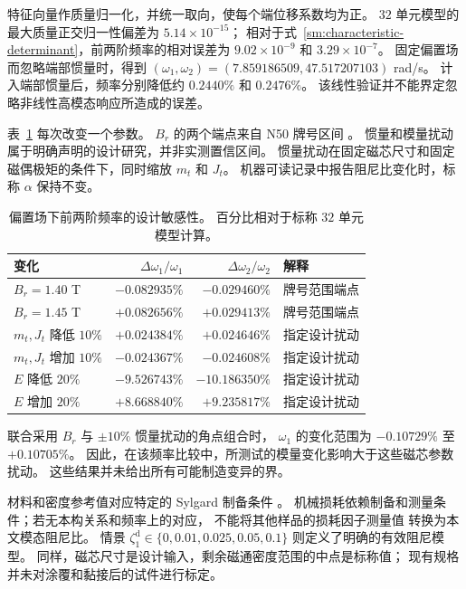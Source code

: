 特征向量作质量归一化，并统一取向，使每个端位移系数均为正。
$32$ 单元模型的最大质量正交归一性偏差为 $5.14\times10^{-15}$；
相对于式~\eqref{sm:characteristic-determinant}，前两阶频率的相对误差为
$9.02\times10^{-9}$ 和 $3.29\times10^{-7}$。
固定偏置场而忽略端部惯量时，得到
$(\omega_1,\omega_2)=(7.859186509,47.517207103)$ rad/s。
计入端部惯量后，频率分别降低约 $0.2440\%$ 和 $0.2476\%$。
该线性验证并不能界定忽略非线性高模态响应所造成的误差。

表~\ref{sm:sensitivity-table} 每次改变一个参数。
$B_r$ 的两个端点来自 N50 牌号区间 \citep{smN50}。
惯量和模量扰动属于明确声明的设计研究，并非实测置信区间。
惯量扰动在固定磁芯尺寸和固定磁偶极矩的条件下，同时缩放 $m_t$ 和 $J_t$。
机器可读记录中报告阻尼比变化时，标称 $\alpha$ 保持不变。

\begin{table}[t]
\centering\small
\caption{偏置场下前两阶频率的设计敏感性。
百分比相对于标称 $32$ 单元模型计算。}
\label{sm:sensitivity-table}
\begin{tabular}{lrrl}
\toprule
变化 & $\Delta\omega_1/\omega_1$ & $\Delta\omega_2/\omega_2$ & 解释\\
\midrule
$B_r=1.40$ T & $-0.082935\%$ & $-0.029460\%$ & 牌号范围端点\\
$B_r=1.45$ T & $+0.082656\%$ & $+0.029413\%$ & 牌号范围端点\\
$m_t,J_t$ 降低 $10\%$ & $+0.024384\%$ & $+0.024646\%$ & 指定设计扰动\\
$m_t,J_t$ 增加 $10\%$ & $-0.024367\%$ & $-0.024608\%$ & 指定设计扰动\\
$E$ 降低 $20\%$ & $-9.526743\%$ & $-10.186350\%$ & 指定设计扰动\\
$E$ 增加 $20\%$ & $+8.668840\%$ & $+9.235817\%$ & 指定设计扰动\\
\bottomrule
\end{tabular}
\end{table}

联合采用 $B_r$ 与 $\pm10\%$ 惯量扰动的角点组合时，
$\omega_1$ 的变化范围为 $-0.10729\%$ 至 $+0.10705\%$。
因此，在该频率比较中，所测试的模量变化影响大于这些磁芯参数扰动。
这些结果并未给出所有可能制造变异的界。

材料和密度参考值对应特定的 Sylgard 制备条件 \citep{cho2021pdms}。
机械损耗依赖制备和测量条件；若无本构关系和频率上的对应，
不能将其他样品的损耗因子测量值 \citep{fischer2017adhesion} 转换为本文模态阻尼比。
情景 $\zeta_1^{\mathrm{d}}\in\{0,0.01,0.025,0.05,0.1\}$ 则定义了明确的有效阻尼模型。
同样，磁芯尺寸是设计输入，剩余磁通密度范围的中点是标称值；
现有规格并未对涂覆和黏接后的试件进行标定。

